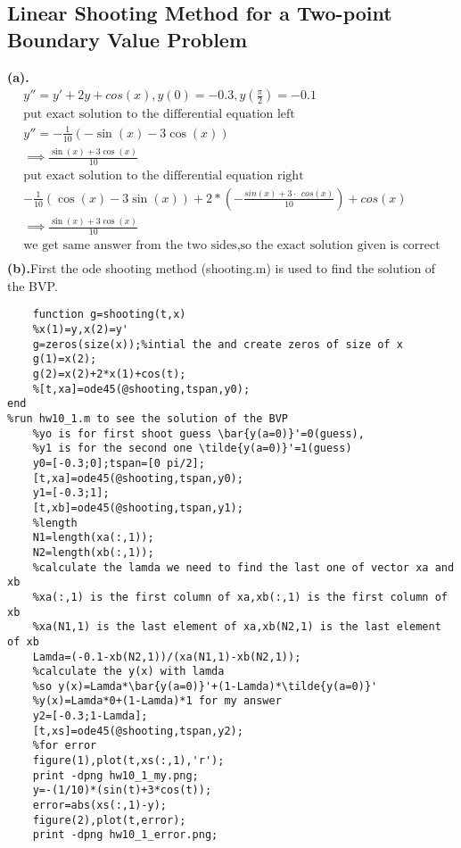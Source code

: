 \subsection{Linear Shooting Method for a Two-point Boundary Value Problem} 
\textbf{(a).}
\[\begin{aligned}
y''=y'+2y+cos(x),y(0)=-0.3,y(\frac{\pi}{2})=-0.1\\
\text{put exact solution to the differential equation left}\\
y''=-\frac{1}{10}\left(-\sin \left(x\right)-3\cos \left(x\right)\right)\\
\implies \frac{\sin \left(x\right)+3\cos \left(x\right)}{10}\\
\text{put exact solution to the differential equation right}\\
-\frac{1}{10}\left(\cos \left(x\right)-3\sin \left(x\right)\right)+2*(-\frac{sin\left(x\right)+3\cdot \:\:cos\left(x\right)}{10})+cos(x)\\
\implies \frac{\sin \left(x\right)+3\cos \left(x\right)}{10}\\
\text{we get same answer from the two sides,so the exact solution given is correct}\\
\end{aligned}
\]
\textbf{(b).}First the ode shooting method (shooting.m) is used to find the solution of the BVP.\\
\begin{verbatim}
    function g=shooting(t,x)
    %x(1)=y,x(2)=y'
    g=zeros(size(x));%intial the and create zeros of size of x
    g(1)=x(2);
    g(2)=x(2)+2*x(1)+cos(t);
    %[t,xa]=ode45(@shooting,tspan,y0);
end
%run hw10_1.m to see the solution of the BVP
    %yo is for first shoot guess \bar{y(a=0)}'=0(guess),
    %y1 is for the second one \tilde{y(a=0)}'=1(guess)
    y0=[-0.3;0];tspan=[0 pi/2];
    [t,xa]=ode45(@shooting,tspan,y0);
    y1=[-0.3;1];
    [t,xb]=ode45(@shooting,tspan,y1);
    %length
    N1=length(xa(:,1));
    N2=length(xb(:,1));
    %calculate the lamda we need to find the last one of vector xa and xb
    %xa(:,1) is the first column of xa,xb(:,1) is the first column of xb
    %xa(N1,1) is the last element of xa,xb(N2,1) is the last element of xb
    Lamda=(-0.1-xb(N2,1))/(xa(N1,1)-xb(N2,1));
    %calculate the y(x) with lamda 
    %so y(x)=Lamda*\bar{y(a=0)}'+(1-Lamda)*\tilde{y(a=0)}'
    %y(x)=Lamda*0+(1-Lamda)*1 for my answer
    y2=[-0.3;1-Lamda];
    [t,xs]=ode45(@shooting,tspan,y2);
    %for error
    figure(1),plot(t,xs(:,1),'r');
    print -dpng hw10_1_my.png;
    y=-(1/10)*(sin(t)+3*cos(t));
    error=abs(xs(:,1)-y);
    figure(2),plot(t,error);
    print -dpng hw10_1_error.png;
\end{verbatim}
\newpage
